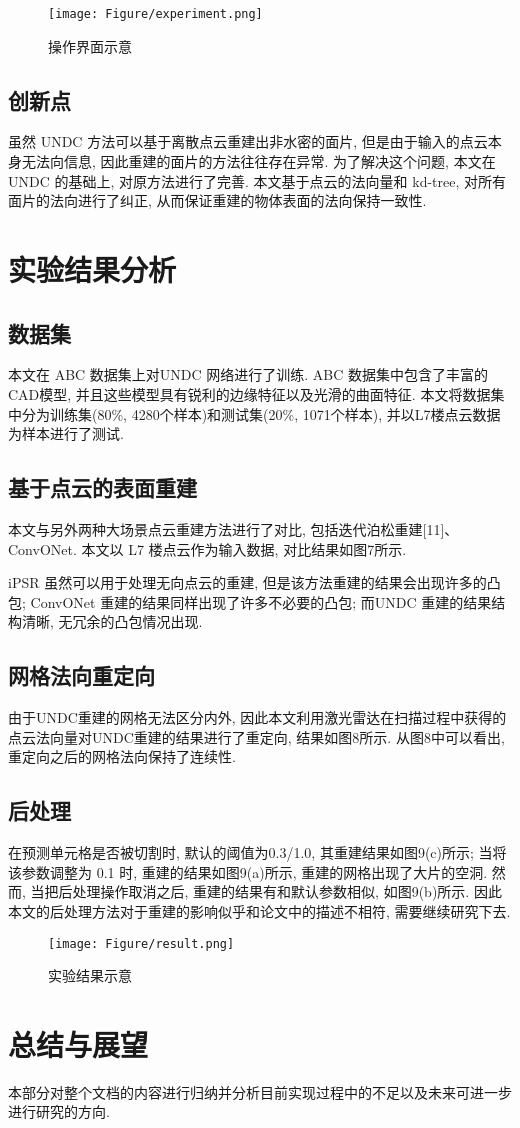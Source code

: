 \begin{figure}[H]
	\center
	\texttt{[image: Figure/experiment.png]}
	\centering
	\caption{操作界面示意}\label{fig:fig2}
\end{figure}

\subsection{创新点}
虽然 UNDC 方法可以基于离散点云重建出非水密的面片, 但是由于输入的点云本身无法向信息, 因此重建的面片的方法往往存在异常. 为了解决这个问题, 本文在 UNDC 的基础上, 对原方法进行了完善. 本文基于点云的法向量和 kd-tree, 对所有面片的法向进行了纠正, 从而保证重建的物体表面的法向保持一致性. 
\section{实验结果分析}
\subsection{数据集}
本文在 ABC 数据集上对UNDC 网络进行了训练. ABC 数据集中包含了丰富的CAD模型, 并且这些模型具有锐利的边缘特征以及光滑的曲面特征. 本文将数据集中分为训练集(80\%, 4280个样本)和测试集(20\%, 1071个样本), 并以L7楼点云数据为样本进行了测试. 
\subsection{基于点云的表面重建}
本文与另外两种大场景点云重建方法进行了对比, 包括迭代泊松重建[11]、ConvONet. 本文以 L7 楼点云作为输入数据, 对比结果如图7所示. 

iPSR 虽然可以用于处理无向点云的重建, 但是该方法重建的结果会出现许多的凸包; ConvONet 重建的结果同样出现了许多不必要的凸包; 而UNDC 重建的结果结构清晰, 无冗余的凸包情况出现. 
\subsection{网格法向重定向}
由于UNDC重建的网格无法区分内外, 因此本文利用激光雷达在扫描过程中获得的点云法向量对UNDC重建的结果进行了重定向, 结果如图8所示. 从图8中可以看出, 重定向之后的网格法向保持了连续性. 


\subsection{后处理}
在预测单元格是否被切割时, 默认的阈值为0.3/1.0, 其重建结果如图9(c)所示; 当将该参数调整为 0.1 时, 重建的结果如图9(a)所示, 重建的网格出现了大片的空洞. 然而, 当把后处理操作取消之后, 重建的结果有和默认参数相似, 如图9(b)所示. 因此本文的后处理方法对于重建的影响似乎和论文中的描述不相符, 需要继续研究下去. 


\begin{figure}[H]
	\center
	\texttt{[image: Figure/result.png]}
	\centering
	\caption{实验结果示意}\label{fig:fig3}
\end{figure}

\section{总结与展望}
本部分对整个文档的内容进行归纳并分析目前实现过程中的不足以及未来可进一步进行研究的方向. 


\printbibliography%
